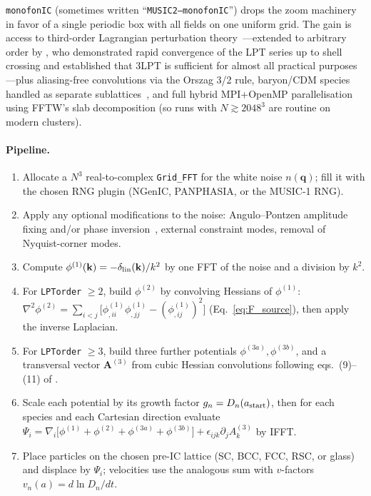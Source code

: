 \documentclass[12pt]{article}
\newcommand{\bq}{\mathbf{q}}
\newcommand{\bk}{\mathbf{k}}
\begin{document}
\texttt{monofonIC} (sometimes written ``\texttt{MUSIC2--monofonIC}'')
drops the zoom machinery in favor of a single periodic box with all
fields on one uniform grid.  The gain is access to third-order
Lagrangian perturbation theory~\citep{Michaux2020}---extended to
arbitrary order by \citet{RampfHahn2021}, who demonstrated rapid
convergence of the LPT series up to shell crossing and established
that 3LPT is sufficient for almost all practical purposes---plus
aliasing-free convolutions via the Orszag 3/2 rule, baryon/CDM species
handled as separate sublattices~\citep{HahnRampfUhlemann2021}, and full
hybrid MPI+OpenMP parallelisation using FFTW's slab decomposition
(so runs with $N \gtrsim 2048^3$ are routine on modern clusters).

\paragraph{Pipeline.}
\begin{enumerate}
  \item Allocate a $N^3$ real-to-complex \texttt{Grid\_FFT} for the
        white noise $n(\bq)$; fill it with the chosen RNG plugin
        (NGenIC, PANPHASIA, or the MUSIC-1 RNG).
  \item Apply any optional modifications to the noise: Angulo--Pontzen
        amplitude fixing and/or phase inversion~\citep{Angulo2016},
        external constraint modes, removal of Nyquist-corner modes.
  \item Compute $\phi^{(1)}(\bk) = -\delta_{\rm lin}(\bk)/k^2$ by one
        FFT of the noise and a division by $k^2$.
  \item For \texttt{LPTorder} $\geq 2$, build $\phi^{(2)}$ by
        convolving Hessians of $\phi^{(1)}$:
        $\nabla^2\phi^{(2)} = \sum_{i<j}\!\bigl[
           \phi^{(1)}_{,ii}\phi^{(1)}_{,jj}
         - (\phi^{(1)}_{,ij})^2\bigr]$
        (Eq.~\ref{eq:F_source}), then apply the inverse Laplacian.
  \item For \texttt{LPTorder} $\geq 3$, build three further potentials
        $\phi^{(3a)}, \phi^{(3b)}$, and a transversal vector
        $\mathbf{A}^{(3)}$ from cubic Hessian convolutions following
        eqs.~(9)--(11) of \citet{Michaux2020}.
  \item Scale each potential by its growth factor
        $g_n = D_n(a_{\rm start})$, then for each species and each
        Cartesian direction evaluate
        $\Psi_i = \nabla_i\bigl[\phi^{(1)}+\phi^{(2)}+\phi^{(3a)}
          +\phi^{(3b)}\bigr]
          + \epsilon_{ijk}\partial_j A^{(3)}_k$
        by IFFT.
  \item Place particles on the chosen pre-IC lattice (SC, BCC, FCC,
        RSC, or glass) and displace by $\Psi_i$; velocities use the
        analogous sum with $v$-factors $v_n(a) = d\ln D_n/dt$.
\end{enumerate}
\end{document}
